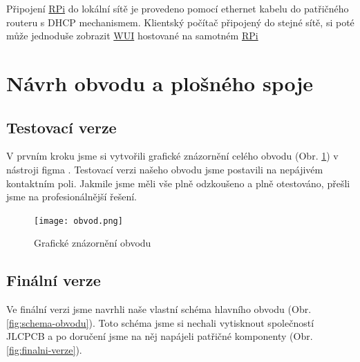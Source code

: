 \documentclass[czech,12pt,a4paper]{article}
\begin{document}
Připojení \underline{\ac{RPi}} do lokální sítě je provedeno pomocí ethernet kabelu do patřičného routeru s \ac{DHCP} mechanismem. Klientský počítač připojený do stejné sítě, si poté může jednoduše zobrazit \underline{\ac{WUI}} hostované na samotném \underline{\ac{RPi}}

\clearpage

\section{Návrh obvodu a plošného spoje} \label{secPCB}

\subsection{Testovací verze}

V prvním kroku jsme si vytvořili grafické znázornění celého obvodu (Obr. \ref{fig:graficke-znazorneni-obvodu}) v nástroji figma \cite{figma}. Testovací verzi našeho obvodu jsme postavili na nepájivém kontaktním poli. Jakmile jsme měli vše plně odzkoušeno a plně otestováno, přešli jsme na profesionálnější řešení.

\noindent\begin{figure}[h]
	\texttt{[image: obvod.png]}
	\caption{Grafické znázornění obvodu}
	\label{fig:graficke-znazorneni-obvodu}
\end{figure}

\clearpage

\subsection{Finální verze}

Ve finální verzi jsme navrhli naše vlastní schéma hlavního obvodu (Obr. \ref{fig:schema-obvodu}). Toto schéma jsme si nechali vytisknout společností JLCPCB a po doručení jsme na něj napájeli patřičné komponenty (Obr. \ref{fig:finalni-verze}).
\end{document}
